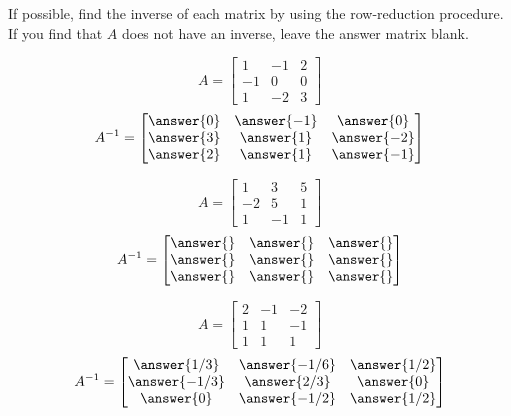 \documentclass{ximera}
\begin{document}
\begin{problem}
If possible, find the inverse of each matrix by using the row-reduction procedure.  If you find that $A$ does not have an inverse, leave the answer matrix blank.
  \begin{problem}\label{prob:findinverse1}
  $$A=\begin{bmatrix}1&-1&2\\-1&0&0\\1&-2&3\end{bmatrix}$$
  $$A^{-1}=\begin{bmatrix}\answer{0} & \answer{-1} & \answer{0} \\ \answer{3} & \answer{1} & \answer{-2}\\ \answer{2} & \answer{1} & \answer{-1}\end{bmatrix}$$
  
 
 \begin{multipleChoice}
\end{multipleChoice}
  \end{problem}
  

  \begin{problem}\label{prob:findinverse2}
  $$A=\begin{bmatrix}1&3&5\\-2&5&1\\1&-1&1\end{bmatrix}$$
  $$A^{-1}=\begin{bmatrix}\answer{} &\answer{}&\answer{}\\\answer{}&\answer{}&\answer{}\\\answer{}&\answer{}&\answer{}\end{bmatrix}$$
  
 
 \begin{multipleChoice}
\end{multipleChoice}
  \end{problem}  
  
\begin{problem}\label{prob:findinverse3}
  $$A=\begin{bmatrix}2&-1&-2\\1&1&-1\\1&1&1\end{bmatrix}$$
  $$A^{-1}=\begin{bmatrix}\answer{1/3} & \answer{-1/6} & \answer{1/2} \\  \answer{-1/3} & \answer{2/3} & \answer{0}\\\answer{0} & \answer{-1/2} & \answer{1/2}\end{bmatrix}$$
  
 
 
 \begin{multipleChoice}
\end{multipleChoice}
  \end{problem}   
  
\end{problem}
\end{document}
